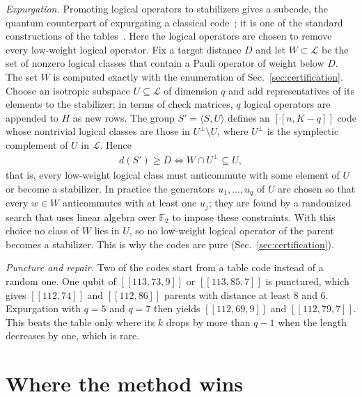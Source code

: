 \documentclass[reprint,pra,superscriptaddress,nofootinbib]{revtex4-2}
\newcommand{\F}{\mathbb{F}_2}
\begin{document}
\emph{Expurgation.} Promoting logical operators to stabilizers gives a subcode, the quantum counterpart of
expurgating a classical code~\cite{macwilliams}; it is one of the standard constructions of the
tables~\cite{crss,grassl}. Here the logical operators are chosen to remove every low-weight logical operator. Fix a
target distance $D$ and let $W\subset\mathcal{L}$ be the set of nonzero logical classes that contain a Pauli operator
of weight below $D$. The set $W$ is computed exactly with the enumeration of Sec.~\ref{sec:certification}. Choose an
isotropic subspace $U\subseteq\mathcal{L}$ of dimension $q$ and add representatives of its elements to the stabilizer;
in terms of check matrices, $q$ logical operators are appended to $H$ as new rows. The group $S'=\langle S,U\rangle$
defines an $[[n,K-q]]$ code whose nontrivial logical classes are those in $U^{\perp}\setminus U$, where $U^{\perp}$ is
the symplectic complement of $U$ in $\mathcal{L}$. Hence
\begin{align}
d(S')\ge D \iff W\cap U^{\perp}\subseteq U ,\label{eq:criterion}
\end{align}
that is, every low-weight logical class must anticommute with some element of $U$ or become a stabilizer. In practice
the generators $u_1,\dots,u_q$ of $U$ are chosen so that every $w\in W$ anticommutes with at least one $u_j$; they are
found by a randomized search that uses linear algebra over $\F$ to impose these constraints. With this choice no class of $W$ lies in $U$, so no low-weight logical operator of the parent becomes a stabilizer. This is why the codes are pure (Sec.~\ref{sec:certification}).

\emph{Puncture and repair.} Two of the codes start from a table code instead of a random one. One qubit of
$[[113,73,9]]$ or $[[113,85,7]]$ is punctured, which gives $[[112,74]]$ and $[[112,86]]$ parents with distance at
least 8 and 6. Expurgation with $q=5$ and $q=7$ then yields $[[112,69,9]]$ and $[[112,79,7]]$. This beats the table
only where its $k$ drops by more than $q-1$ when the length decreases by one, which is rare.

\section{Where the method wins}\label{sec:counting}
\end{document}
